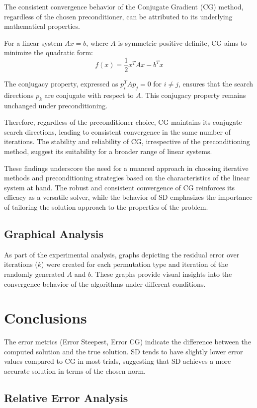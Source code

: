 \documentclass[12pt, letterpaper]{article}
\begin{document}
The consistent convergence behavior of the Conjugate Gradient (CG) method, regardless of the chosen preconditioner, can be attributed to its underlying mathematical properties.

For a linear system \(Ax = b\), where \(A\) is symmetric positive-definite, CG aims to minimize the quadratic form:
\[f(x) = \frac{1}{2}x^T A x - b^T x\]

The conjugacy property, expressed as \(p_i^T A p_j = 0\) for \(i \neq j\), ensures that the search directions \(p_k\) are conjugate with respect to \(A\). This conjugacy property remains unchanged under preconditioning.

Therefore, regardless of the preconditioner choice, CG maintains its conjugate search directions, leading to consistent convergence in the same number of iterations. The stability and reliability of CG, irrespective of the preconditioning method, suggest its suitability for a broader range of linear systems.

These findings underscore the need for a nuanced approach in choosing iterative methods and preconditioning strategies based on the characteristics of the linear system at hand. The robust and consistent convergence of CG reinforces its efficacy as a versatile solver, while the behavior of SD emphasizes the importance of tailoring the solution approach to the properties of the problem.

\subsection*{Graphical Analysis}

As part of the experimental analysis, graphs depicting the residual error over iterations (\(k\)) were created for each permutation type and iteration of the randomly generated \(A\) and \(b\). These graphs provide visual insights into the convergence behavior of the algorithms under different conditions.

\section{Conclusions}

The error metrics (Error Steepest, Error CG) indicate the difference between the computed solution and the true solution. SD tends to have slightly lower error values compared to CG in most trials, suggesting that SD achieves a more accurate solution in terms of the chosen norm.

\subsection*{Relative Error Analysis}
\end{document}
